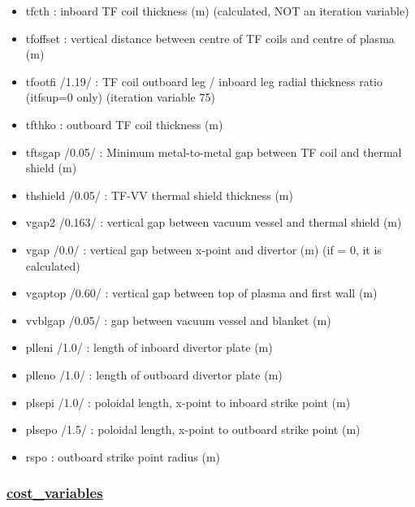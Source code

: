 \documentclass[]{article}
\begin{document}
\begin{itemize}
\begin{itemize}
  \item
    tfcth : inboard TF coil thickness (m)
    (calculated, NOT an iteration variable)
  \item
    tfoffset : vertical distance between centre of TF coils and centre
    of plasma (m)
  \item
    tfootfi /1.19/ : TF coil outboard leg / inboard leg radial thickness
    ratio (itfsup=0 only) (iteration variable 75)
  \item
    tfthko : outboard TF coil thickness (m)
  \item
    tftsgap /0.05/ : Minimum metal-to-metal gap between TF coil and
    thermal shield (m)
  \item
    thshield /0.05/ : TF-VV thermal shield thickness (m)
  \item
    vgap2 /0.163/ : vertical gap between vacuum vessel and thermal shield (m)
  \item
    vgap /0.0/ : vertical gap between x-point and divertor (m) (if = 0,
    it is calculated)
  \item
    vgaptop /0.60/ : vertical gap between top of plasma and first wall
    (m)
  \item
    vvblgap /0.05/ : gap between vacuum vessel and blanket (m)
  \item
    plleni /1.0/ : length of inboard divertor plate (m)
  \item
    plleno /1.0/ : length of outboard divertor plate (m)
  \item
    plsepi /1.0/ : poloidal length, x-point to inboard strike point (m)
  \item
    plsepo /1.5/ : poloidal length, x-point to outboard strike point (m)
  \item
    rspo : outboard strike point radius (m)
  \end{itemize}

  \subsubsection{\texorpdfstring{\href{cost_variables.html}{cost\_variables}}{cost\_variables}}\label{cost_variables}


\end{itemize}
\end{document}
